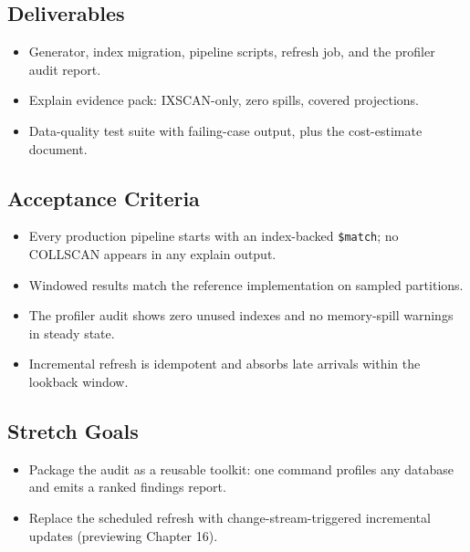 \subsection*{Deliverables}
\begin{itemize}
    \item Generator, index migration, pipeline scripts, refresh job, and the profiler audit report.
    \item Explain evidence pack: IXSCAN-only, zero spills, covered projections.
    \item Data-quality test suite with failing-case output, plus the cost-estimate document.
\end{itemize}

\subsection*{Acceptance Criteria}
\begin{itemize}
    \item Every production pipeline starts with an index-backed \texttt{\$match}; no COLLSCAN appears in any explain output.
    \item Windowed results match the reference implementation on sampled partitions.
    \item The profiler audit shows zero unused indexes and no memory-spill warnings in steady state.
    \item Incremental refresh is idempotent and absorbs late arrivals within the lookback window.
\end{itemize}

\subsection*{Stretch Goals}
\begin{itemize}
    \item Package the audit as a reusable toolkit: one command profiles any database and emits a ranked findings report.
    \item Replace the scheduled refresh with change-stream-triggered incremental updates (previewing Chapter 16).
\end{itemize}
